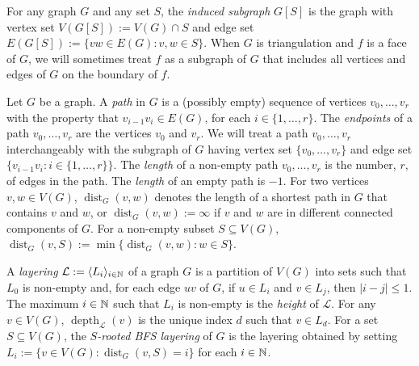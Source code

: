 \documentclass{patmorin}
\DeclareMathOperator{\height}{height}
\DeclareMathOperator{\depth}{depth}
\DeclareMathOperator{\dist}{dist}
\begin{document}

For any graph $G$ and any set $S$, the \emph{induced subgraph} $G[S]$ is the graph with vertex set $V(G[S]):=V(G)\cap S$ and edge set $E(G[S]):=\{vw\in E(G):v,w\in S\}$.  When $G$ is triangulation and $f$ is a face of $G$, we will sometimes treat $f$ as a subgraph of $G$ that includes all vertices and edges of $G$ on the boundary of $f$.

Let $G$ be a graph. A \emph{path} in $G$ is a (possibly empty) sequence of vertices $v_0,\ldots,v_r$ with the property that $v_{i-1}v_i\in E(G)$, for each $i\in\{1,\ldots,r\}$.  The \emph{endpoints} of a path $v_0,\ldots,v_r$ are the vertices $v_0$ and $v_r$.  We will treat a path $v_0,\ldots,v_r$ interchangeably with the subgraph of $G$ having vertex set $\{v_0,\ldots,v_r\}$ and edge set $\{v_{i-1}v_i:i\in\{1,\ldots,r\}\}$.  The \emph{length} of a non-empty path $v_0,\ldots,v_r$ is the number, $r$, of edges in the path.  The \emph{length} of an empty path is $-1$. For two vertices $v,w\in V(G)$, $\dist_G(v,w)$ denotes the length of a shortest path in $G$ that contains $v$ and $w$, or $\dist_G(v,w):=\infty$ if $v$ and $w$ are in different connected components of $G$.  For a non-empty subset $S\subseteq V(G)$, $\dist_G(v,S):=\min\{\dist_G(v,w):w\in S\}$.


A \emph{layering} $\mathcal{L}:=\langle L_i\rangle_{i\in\mathbb{N}}$ of a graph $G$ is a partition of $V(G)$ into sets such that $L_0$ is non-empty and, for each edge $uv$ of $G$, if $u\in L_i$ and $v\in L_j$, then $|i-j|\le 1$.  The maximum $i\in\mathbb{N}$ such that $L_i$ is non-empty is the \emph{height} of $\mathcal{L}$.
For any $v\in V(G)$, $\depth_\mathcal{L}(v)$ is the unique index $d$ such that $v\in L_d$. For a set $S\subseteq V(G)$, the \emph{$S$-rooted BFS layering} of $G$ is the layering obtained by setting $L_i:=\{v\in V(G):\dist_G(v,S)=i\}$ for each $i\in\mathbb{N}$.
\end{document}
